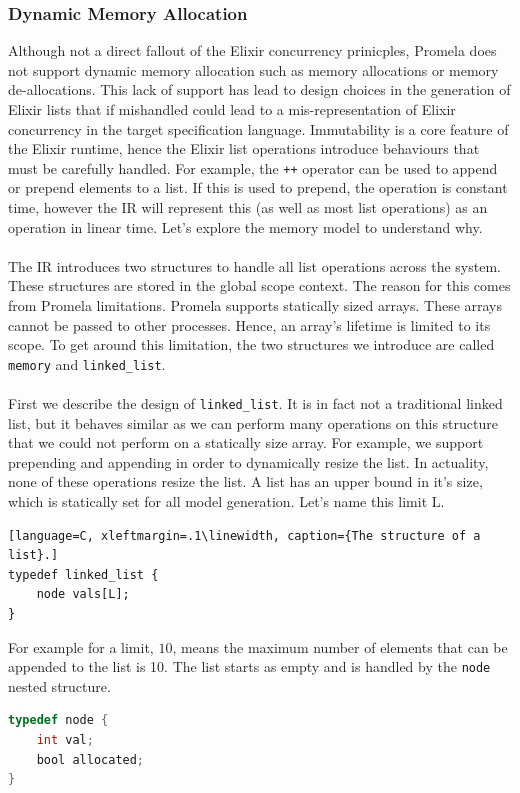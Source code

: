 \subsubsection{Dynamic Memory Allocation}
Although not a direct fallout of the Elixir concurrency prinicples, Promela does not support dynamic memory allocation such as memory allocations or memory de-allocations. This lack of support has lead to design choices in the generation of Elixir lists that if mishandled could lead to a mis-representation of Elixir concurrency in the target specification language. Immutability is a core feature of the Elixir runtime, hence the Elixir list operations introduce behaviours that must be carefully handled. For example, the \texttt{++} operator can be used to append or prepend elements to a list. If this is used to prepend, the operation is constant time, however the IR will represent this (as well as most list operations) as an operation in linear time. Let's explore the memory model to understand why. 
\\ \\
The IR introduces two structures to handle all list operations across the system. These structures are stored in the global scope context. The reason for this comes from Promela limitations. Promela supports statically sized arrays. These arrays cannot be passed to other processes. Hence, an array's lifetime is limited to its scope. To get around this limitation, the two structures we introduce are called \texttt{memory} and \texttt{linked\_list}.
\\ \\
First we describe the design of \texttt{linked\_list}. It is in fact not a traditional linked list, but it behaves similar as we can perform many operations on this structure that we could not perform on a statically size array. For example, we support prepending and appending in order to dynamically resize the list. In actuality, none of these operations resize the list. A list has an upper bound in it's size, which is statically set for all model generation. Let's name this limit L.
\begin{lstlisting}[language=C, xleftmargin=.1\linewidth, caption={The structure of a list}.]
typedef linked_list {
    node vals[L];
}
\end{lstlisting}
For example for a limit, $10$, means the maximum number of elements that can be appended to the list is 10. The list starts as empty and is handled by the \texttt{node} nested structure.
\begin{lstlisting}[language=C, xleftmargin=.1\linewidth, caption={Example of a list node typed `int'.}]
typedef node {
    int val;
    bool allocated;
}
\end{lstlisting}
